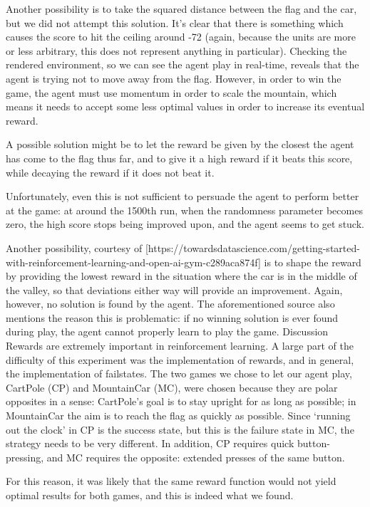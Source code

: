 \documentclass[a4paper]{article}
\begin{document}
Another possibility is to take the squared distance between the flag and the car, but we did not attempt this solution.
It’s clear that there is something which causes the score to hit the ceiling around -72 (again, because the units are more or less arbitrary, this does not represent anything in particular). Checking the rendered environment, so we can see the agent play in real-time, reveals that the agent is trying not to move away from the flag. However, in order to win the game, the agent must use momentum in order to scale the mountain, which means it needs to accept some less optimal values in order to increase its eventual reward.

A possible solution might be to let the reward be given by the closest the agent has come to the flag thus far, and to give it a high reward if it beats this score, while decaying the reward if it does not beat it.

Unfortunately, even this is not sufficient to persuade the agent to perform better at the game: at around the 1500th run, when the randomness parameter becomes zero, the high score stops being improved upon, and the agent seems to get stuck.

Another possibility, courtesy of [https://towardsdatascience.com/getting-started-with-reinforcement-learning-and-open-ai-gym-c289aca874f] is to shape the reward by providing the lowest reward in the situation where the car is in the middle of the valley, so that deviations either way will provide an improvement. Again, however, no solution is found by the agent. The aforementioned source also mentions the reason this is problematic: if no winning solution is ever found during play, the agent cannot properly learn to play the game.
Discussion
Rewards are extremely important in reinforcement learning. A large part of the difficulty of this experiment was the implementation of rewards, and in general, the implementation of failstates. The two games we chose to let our agent play, CartPole (CP) and MountainCar (MC), were chosen because they are polar opposites in a sense: CartPole’s goal is to stay upright for as long as possible; in MountainCar the aim is to reach the flag as quickly as possible. Since `running out the clock’ in CP is the success state, but this is the failure state in MC, the strategy needs to be very different. In addition, CP requires quick button-pressing, and MC requires the opposite: extended presses of the same button.

For this reason, it was likely that the same reward function would not yield optimal results for both games, and this is indeed what we found.
\end{document}
